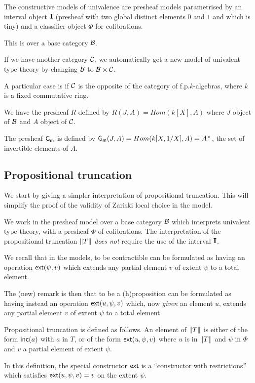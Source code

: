 The constructive models of univalence are presheaf models parametrised by an interval object $\mathbf{I}$
(presheaf with two global distinct elements $0$ and $1$ and which is tiny) and a classifier object
$\Phi$ for cofibrations.

 This is over a base category $\mathcal{B}$.
 
 If we have another category $\mathcal{C}$, we automatically get a new model of univalent type theory by
 changing $\mathcal{B}$ to $\mathcal{B}\times\mathcal{C}$.

 A particular case is if $\mathcal{C}$ is the opposite of the category of f.p.\@ $k$-algebras, where $k$ is a
 fixed commutative ring.

 We have the presheaf $R$ defined by $R(J,A) = Hom(k[X],A)$ where $J$ object of $\mathcal{B}$ and $A$ object of $\mathcal{C}$.

  The presheaf $\mathsf{G_m}$ is defined by $\mathsf{G_m}(J,A) = Hom(k[X,1/X],A) = A^{\times}$, the set of invertible elements of $A$.

\subsection{Propositional truncation}

    We start by giving a simpler interpretation of propositional truncation. This will simplify
    the proof of the validity of Zariski local choice in the model.

    We work in the presheaf model over a base category $\mathcal{B}$ which interprets univalent type theory,
    with a presheaf $\Phi$ of cofibrations. The interpretation of the propositional
    truncation $\left\lVert T \right\rVert$ {\em does not} require the use of the interval $\mathbf{I}$.

    We recall that in the models, to be contractible can be formulated as having an operation
    $\mathsf{ext}(\psi,v)$ which extends any partial element $v$ of extent $\psi$ to a total element.

    The (new) remark is then that to be a (h)proposition can be formulated as having instead
    an operation $\mathsf{ext}(u,\psi,v)$ which, now {\em given}
    an element $u$, extends any partial element $v$ of extent $\psi$ to a total element.

\medskip    

Propositional truncation is defined as follows. An element of $\left\lVert T \right\rVert$ is either of the form
$\mathsf{inc}(a)$ with $a$ in $T$, or of the form $\mathsf{ext}(u,\psi,v)$ where $u$ is in $\left\lVert T \right\rVert$ and $\psi$
in $\Phi$ and $v$ a partial element of extent $\psi$.

In this definition, the special constructor $\mathsf{ext}$ is a ``constructor with restrictions'' which
satisfies $\mathsf{ext}(u,\psi,v) = v$ on the extent $\psi$.

